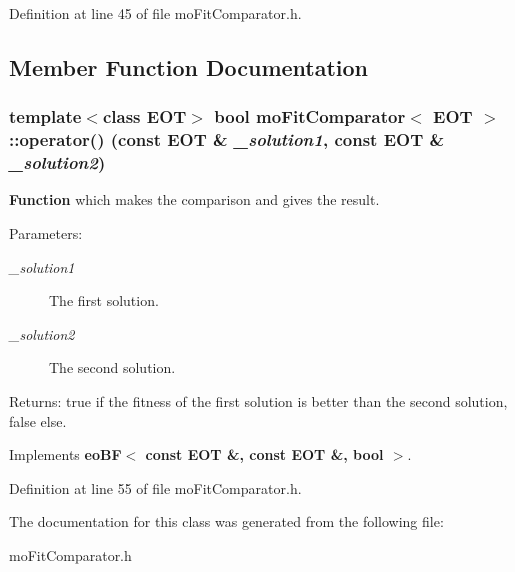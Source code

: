 Definition at line 45 of file moFitComparator.h.

\subsection{Member Function Documentation}
\subsubsection{\setlength{\rightskip}{0pt plus 5cm}template$<$class EOT$>$ bool {\bf moFitComparator}$<$ EOT $>$::operator() (const EOT \& {\em \_\-solution1}, const EOT \& {\em \_\-solution2})\hspace{0.3cm}{\tt  [inline, virtual]}}\label{classmo_fit_comparator_c920d5a49deb16710daf1e5fcde6b16c}


{\bf Function} which makes the comparison and gives the result. 

\begin{Desc}
\item[Parameters:]
\begin{description}
\item[{\em \_\-solution1}]The first solution. \item[{\em \_\-solution2}]The second solution. \end{description}
\end{Desc}
\begin{Desc}
\item[Returns:]true if the fitness of the first solution is better than the second solution, false else. \end{Desc}


Implements {\bf eoBF$<$ const EOT \&, const EOT \&, bool $>$}.

Definition at line 55 of file moFitComparator.h.

The documentation for this class was generated from the following file:\begin{CompactItemize}
\item 
moFitComparator.h\end{CompactItemize}
